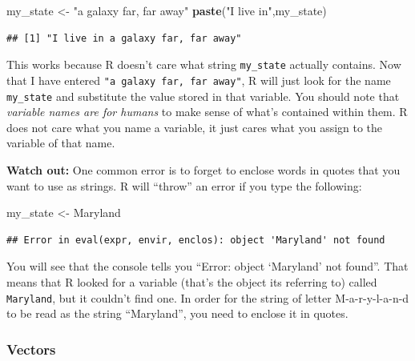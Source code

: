 \documentclass[]{article}
\newenvironment{Shaded}{\begin{snugshade}}{\end{snugshade}}
\newcommand{\KeywordTok}[1]{\textcolor[rgb]{0.13,0.29,0.53}{\textbf{{#1}}}}
\newcommand{\StringTok}[1]{\textcolor[rgb]{0.31,0.60,0.02}{{#1}}}
\newcommand{\NormalTok}[1]{{#1}}
\begin{document}
\begin{Shaded}
\begin{Highlighting}[]
\NormalTok{my_state <-}\StringTok{ "a galaxy far, far away"}
\KeywordTok{paste}\NormalTok{(}\StringTok{"I live in"}\NormalTok{,my_state)}
\end{Highlighting}
\end{Shaded}

\begin{verbatim}
## [1] "I live in a galaxy far, far away"
\end{verbatim}

This works because R doesn't care what string \texttt{my\_state}
actually contains. Now that I have entered
\texttt{"a\ galaxy\ far,\ far\ away"}, R will just look for the name
\texttt{my\_state} and substitute the value stored in that variable. You
should note that \emph{variable names are for humans} to make sense of
what's contained within them. R does not care what you name a variable,
it just cares what you assign to the variable of that name.

\textbf{Watch out:} One common error is to forget to enclose words in
quotes that you want to use as strings. R will ``throw'' an error if you
type the following:

\begin{Shaded}
\begin{Highlighting}[]
\NormalTok{my_state <-}\StringTok{ }\NormalTok{Maryland}
\end{Highlighting}
\end{Shaded}

\begin{verbatim}
## Error in eval(expr, envir, enclos): object 'Maryland' not found
\end{verbatim}

You will see that the console tells you ``Error: object `Maryland' not
found''. That means that R looked for a variable (that's the object its
referring to) called \texttt{Maryland}, but it couldn't find one. In
order for the string of letter M-a-r-y-l-a-n-d to be read as the string
``Maryland'', you need to enclose it in quotes.

\hypertarget{vars_vector}{\subsubsection{Vectors}\label{vars_vector}}
\end{document}
